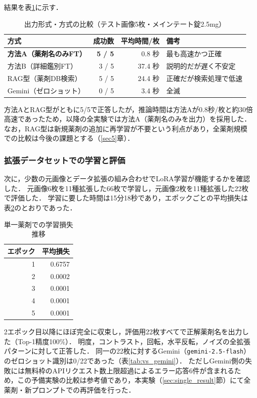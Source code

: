 \documentclass[dvipdfmx]{jsarticle}
\begin{document}
結果を表\ref{tab:method_compare}に示す．

\begin{table}[htbp]
\centering
\caption{出力形式・方式の比較（テスト画像5枚・メインテート錠2.5mg）}
\label{tab:method_compare}
\begin{tabular}{lrrl}
\hline
方式 & 成功数 & 平均時間/枚 & 備考 \\
\hline
\textbf{方法A（薬剤名のみFT）} & \textbf{5 / 5} & 0.8 秒 & 最も高速かつ正確 \\
方法B（詳細鑑別FT） & 3 / 5 & 37.4 秒 & 説明的だが遅く不安定 \\
RAG型（薬剤DB検索） & 5 / 5 & 24.4 秒 & 正確だが検索処理で低速 \\
Gemini（ゼロショット） & 0 / 5 & 3.4 秒 & 全滅 \\
\hline
\end{tabular}
\end{table}

方法AとRAG型がともに5/5で正答したが，推論時間は方法Aが0.8秒/枚と約30倍高速であったため，以降の全実験では方法A（薬剤名のみを出力）を採用した．
なお，RAG型は新規薬剤の追加に再学習が不要という利点があり，全薬剤規模での比較は今後の課題とする（\ref{sec5}章）．

\subsubsection{拡張データセットでの学習と評価}

次に，少数の元画像とデータ拡張の組み合わせでLoRA学習が機能するかを確認した．
元画像6枚を11種拡張した66枚で学習し，元画像2枚を11種拡張した22枚で評価した．
学習に要した時間は15分18秒であり，エポックごとの平均損失は表\ref{tab:loss_meinte}のとおりであった．

\begin{table}[htbp]
\centering
\caption{単一薬剤での学習損失推移}
\label{tab:loss_meinte}
\begin{tabular}{rr}
\hline
エポック & 平均損失 \\
\hline
1 & 0.6757 \\
2 & 0.0002 \\
3 & 0.0001 \\
4 & 0.0001 \\
5 & 0.0001 \\
\hline
\end{tabular}
\end{table}

2エポック目以降にほぼ完全に収束し，評価用22枚すべてで正解薬剤名を出力した（Top-1精度100\%）．
明度，コントラスト，回転，水平反転，ノイズの全拡張パターンに対して正答した．
同一の22枚に対するGemini（\texttt{gemini-2.5-flash}）のゼロショット識別は0/22であった（表\ref{tab:vs_gemini}）．
ただしGemini側の失敗には無料枠のAPIリクエスト数上限超過によるエラー応答6件が含まれるため，この予備実験の比較は参考値であり，本実験（\ref{sec:single_result}節）にて全薬剤・新プロンプトでの再評価を行った．
\end{document}

